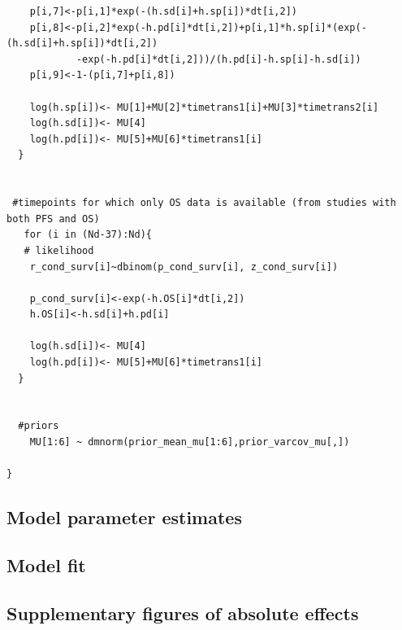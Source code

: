 \documentclass[11pt,final,fleqn]{article}\usepackage[]{graphicx}\usepackage[]{color}
\theoremstyle{plain}
\begin{document}
\begin{appendices}
\begin{verbatim}
    p[i,7]<-p[i,1]*exp(-(h.sd[i]+h.sp[i])*dt[i,2])
    p[i,8]<-p[i,2]*exp(-h.pd[i]*dt[i,2])+p[i,1]*h.sp[i]*(exp(-(h.sd[i]+h.sp[i])*dt[i,2])
    		-exp(-h.pd[i]*dt[i,2]))/(h.pd[i]-h.sp[i]-h.sd[i])
    p[i,9]<-1-(p[i,7]+p[i,8])
    
    log(h.sp[i])<- MU[1]+MU[2]*timetrans1[i]+MU[3]*timetrans2[i] 
    log(h.sd[i])<- MU[4] 
    log(h.pd[i])<- MU[5]+MU[6]*timetrans1[i]
  }
  
  
 #timepoints for which only OS data is available (from studies with both PFS and OS)
   for (i in (Nd-37):Nd){
   # likelihood
    r_cond_surv[i]~dbinom(p_cond_surv[i], z_cond_surv[i]) 
    
    p_cond_surv[i]<-exp(-h.OS[i]*dt[i,2])
    h.OS[i]<-h.sd[i]+h.pd[i]
    
    log(h.sd[i])<- MU[4]
    log(h.pd[i])<- MU[5]+MU[6]*timetrans1[i]
  }
    
  
  #priors
    MU[1:6] ~ dmnorm(prior_mean_mu[1:6],prior_varcov_mu[,]) 
  
}

\end{verbatim}

\subsection{Model parameter estimates}

\subsection{Model fit}\label{app:DIC-1l}

\subsection{Supplementary figures of absolute effects}\label{app:1l-supp-figs}


\end{appendices}
\end{document}
